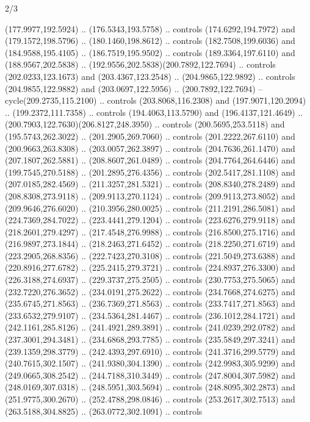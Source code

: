 \begin{flagdescription}{2/3}
\begin{scope}[xshift=0.5\flaglength,yshift=0.5\flagwidth,scale=\flagwidth/525.28]
\begin{scope}[y=0.1mm, x=0.1mm, yscale=-1,shift={(-381.5,-404)}]
  (177.9977,192.5924) .. (176.5343,193.5758) .. controls (174.6292,194.7972) and
  (179.1572,198.5796) .. (180.1460,198.8612) .. controls (182.7508,199.6036) and
  (184.9588,195.4105) .. (186.7519,195.9502) .. controls (189.3364,197.6110) and
  (188.9567,202.5838) .. (192.9556,202.5838)(200.7892,122.7694) .. controls
  (202.0233,123.1673) and (203.4367,123.2548) .. (204.9865,122.9892) .. controls
  (204.9855,122.9882) and (203.0697,122.5956) .. (200.7892,122.7694) --
  cycle(209.2735,115.2100) .. controls (203.8068,116.2308) and
  (197.9071,120.2094) .. (199.2372,111.7358) .. controls (194.4063,113.5790) and
  (196.4137,121.4649) .. (200.7903,122.7630)(206.8127,248.3950) .. controls
  (200.5695,253.5118) and (195.5743,262.3022) .. (201.2905,269.7060) .. controls
  (201.2222,267.6110) and (200.9663,263.8308) .. (203.0057,262.3897) .. controls
  (204.7636,261.1470) and (207.1807,262.5881) .. (208.8607,261.0489) .. controls
  (204.7764,264.6446) and (199.7545,270.5188) .. (201.2895,276.4356) .. controls
  (202.5417,281.1108) and (207.0185,282.4569) .. (211.3257,281.5321) .. controls
  (208.8340,278.2489) and (208.8308,273.9118) .. (209.9113,270.1124) .. controls
  (209.9113,273.8052) and (209.9646,276.6020) .. (210.3956,280.0025) .. controls
  (211.2191,286.5081) and (224.7369,284.7022) .. (223.4441,279.1204) .. controls
  (223.6276,279.9118) and (218.2601,279.4297) .. (217.4548,276.9988) .. controls
  (216.8500,275.1716) and (216.9897,273.1844) .. (218.2463,271.6452) .. controls
  (218.2250,271.6719) and (223.2905,268.8356) .. (222.7423,270.3108) .. controls
  (221.5049,273.6388) and (220.8916,277.6782) .. (225.2415,279.3721) .. controls
  (224.8937,276.3300) and (226.3188,274.6937) .. (229.3737,275.2505) .. controls
  (230.7753,275.5065) and (232.7220,276.3652) .. (234.0191,275.2622) .. controls
  (234.7668,274.6275) and (235.6745,271.8563) .. (236.7369,271.8563) .. controls
  (233.7417,271.8563) and (233.6532,279.9107) .. (234.5364,281.4467) .. controls
  (236.1012,284.1721) and (242.1161,285.8126) .. (241.4921,289.3891) .. controls
  (241.0239,292.0782) and (237.3001,294.3481) .. (234.6868,293.7785) .. controls
  (235.5849,297.3241) and (239.1359,298.3779) .. (242.4393,297.6910) .. controls
  (241.3716,299.5779) and (240.7615,302.1507) .. (241.9380,304.1390) .. controls
  (242.9983,305.9299) and (249.0665,308.2542) .. (244.7188,310.3449) .. controls
  (247.8004,307.5982) and (248.0169,307.0318) .. (248.5951,303.5694) .. controls
  (248.8095,302.2873) and (251.9775,300.2670) .. (252.4788,298.0846) .. controls
  (253.2617,302.7513) and (263.5188,304.8825) .. (263.0772,302.1091) .. controls

\end{scope}
\end{scope}
\end{flagdescription}
